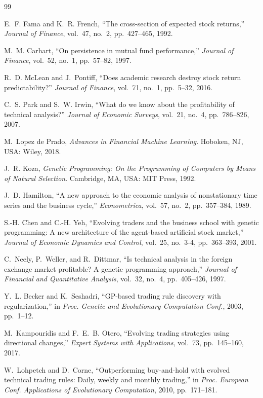 \documentclass{ieeeaccess}
\begin{document}
\begin{thebibliography}{99}

E.~F. Fama and K.~R. French, ``The cross-section of expected stock returns,'' \textit{Journal of Finance}, vol.~47, no.~2, pp.~427--465, 1992.

M.~M. Carhart, ``On persistence in mutual fund performance,'' \textit{Journal of Finance}, vol.~52, no.~1, pp.~57--82, 1997.

R.~D. McLean and J.~Pontiff, ``Does academic research destroy stock return predictability?'' \textit{Journal of Finance}, vol.~71, no.~1, pp.~5--32, 2016.

C.~S. Park and S.~W. Irwin, ``What do we know about the profitability of technical analysis?'' \textit{Journal of Economic Surveys}, vol.~21, no.~4, pp.~786--826, 2007.

M.~Lopez de Prado, \textit{Advances in Financial Machine Learning}. Hoboken, NJ, USA: Wiley, 2018.

J.~R. Koza, \textit{Genetic Programming: On the Programming of Computers by Means of Natural Selection}. Cambridge, MA, USA: MIT Press, 1992.

J.~D. Hamilton, ``A new approach to the economic analysis of nonstationary time series and the business cycle,'' \textit{Econometrica}, vol.~57, no.~2, pp.~357--384, 1989.

S.-H. Chen and C.-H. Yeh, ``Evolving traders and the business school with genetic programming: A new architecture of the agent-based artificial stock market,'' \textit{Journal of Economic Dynamics and Control}, vol.~25, no.~3-4, pp.~363--393, 2001.

C.~Neely, P.~Weller, and R.~Dittmar, ``Is technical analysis in the foreign exchange market profitable? A genetic programming approach,'' \textit{Journal of Financial and Quantitative Analysis}, vol.~32, no.~4, pp.~405--426, 1997.

Y.~L. Becker and K.~Seshadri, ``GP-based trading rule discovery with regularization,'' in \textit{Proc. Genetic and Evolutionary Computation Conf.}, 2003, pp.~1--12.

M.~Kampouridis and F.~E.~B. Otero, ``Evolving trading strategies using directional changes,'' \textit{Expert Systems with Applications}, vol.~73, pp.~145--160, 2017.

W.~Lohpetch and D.~Corne, ``Outperforming buy-and-hold with evolved technical trading rules: Daily, weekly and monthly trading,'' in \textit{Proc. European Conf. Applications of Evolutionary Computation}, 2010, pp.~171--181.


\end{thebibliography}
\end{document}
